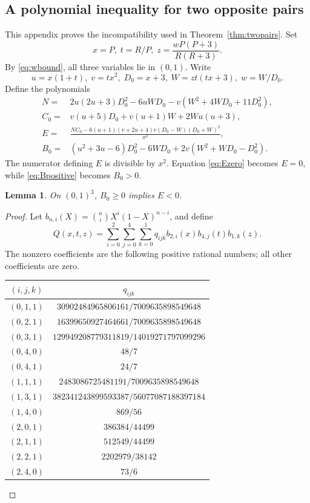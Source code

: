 \documentclass[11pt]{article}
\newtheorem{lemma}[theorem]{Lemma}
\theoremstyle{definition}
\theoremstyle{remark}
\begin{document}
\begin{appendices}

\section{A polynomial inequality for two opposite pairs}
\label{app:bernstein}

This appendix proves the incompatibility used in Theorem~\ref{thm:twopairs}. Set
\[
x=P,\; t=R/P,\;
z=\frac{wP(P+3)}{R(R+3)}.
\]
By \eqref{eq:wbound}, all three variables lie in $(0,1)$. Write
\[
u=x(1+t),\; v=tx^2,\; D_0=x+3,
\; W=zt(tx+3),\; w=W/D_0.
\]
Define the polynomials
\begin{align*}
N={}&2u(2u+3)D_0^2-6uWD_0-v(W^2+4WD_0+11D_0^2),\\
C_0={}&v(u+5)D_0+v(u+1)W+2Wu(u+3),\\
E={}&\frac{NC_0-6(u+1)(v+2u+4)v(D_0-W)(D_0+W)^2}{x^2},\\
B_0={}&(u^2+3u-6)D_0^2-6WD_0+2v(W^2+WD_0-D_0^2).
\end{align*}
The numerator defining $E$ is divisible by $x^2$. Equation \eqref{eq:Ezero} becomes $E=0$, while \eqref{eq:Bpositive} becomes $B_0>0$.

\begin{lemma}
\label{lem:bernstein}
On $(0,1)^3$, $B_0\ge0$ implies $E<0$.
\end{lemma}

\begin{proof}
Let $b_{n,i}(X)=\binom niX^i(1-X)^{n-i}$, and define
\[
Q(x,t,z)=\sum_{i=0}^2\sum_{j=0}^4\sum_{k=0}^1
q_{ijk}b_{2,i}(x)b_{4,j}(t)b_{1,k}(z).
\]
The nonzero coefficients are the following positive rational numbers; all other coefficients are zero.

\begin{center}
\begin{tabular}{cc}
\toprule
$(i,j,k)$ & $q_{ijk}$\\
\midrule
$(0,1,1)$ & $30902484965806161/7009635898549648$\\
$(0,2,1)$ & $16399650927464661/7009635898549648$\\
$(0,3,1)$ & $129949208779311819/14019271797099296$\\
$(0,4,0)$ & $48/7$\\
$(0,4,1)$ & $24/7$\\
$(1,1,1)$ & $2483086725481191/7009635898549648$\\
$(1,3,1)$ & $382341243899593387/56077087188397184$\\
$(1,4,0)$ & $869/56$\\
$(2,0,1)$ & $386384/44499$\\
$(2,1,1)$ & $512549/44499$\\
$(2,2,1)$ & $2202979/38142$\\
$(2,4,0)$ & $73/6$\\
\bottomrule
\end{tabular}
\end{center}


\end{proof}
\end{appendices}
\end{document}
